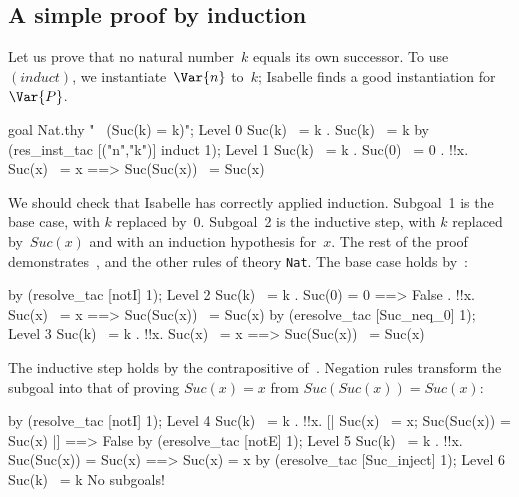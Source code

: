 \subsection{A simple proof by induction}
Let us prove that no natural number~$k$ equals its own successor.  To
use~$(induct)$, we instantiate~$\Var{n}$ to~$k$; Isabelle finds a good
instantiation for~$\Var{P}$.
\begin{ttbox}
goal Nat.thy "~ (Suc(k) = k)";
{\out Level 0}
{\out Suc(k) ~= k}
{. Suc(k) ~= k}
\ttbreak
by (res_inst_tac [("n","k")] induct 1);
{\out Level 1}
{\out Suc(k) ~= k}
{. Suc(0) ~= 0}
{. !!x. Suc(x) ~= x ==> Suc(Suc(x)) ~= Suc(x)}
\end{ttbox}
We should check that Isabelle has correctly applied induction.  Subgoal~1
is the base case, with $k$ replaced by~0.  Subgoal~2 is the inductive step,
with $k$ replaced by~$Suc(x)$ and with an induction hypothesis for~$x$.
The rest of the proof demonstrates~,  and the
other rules of theory {\tt Nat}.  The base case holds by~:
\begin{ttbox}
by (resolve_tac [notI] 1);
{\out Level 2}
{\out Suc(k) ~= k}
{. Suc(0) = 0 ==> False}
{. !!x. Suc(x) ~= x ==> Suc(Suc(x)) ~= Suc(x)}
\ttbreak
by (eresolve_tac [Suc_neq_0] 1);
{\out Level 3}
{\out Suc(k) ~= k}
{. !!x. Suc(x) ~= x ==> Suc(Suc(x)) ~= Suc(x)}
\end{ttbox}
The inductive step holds by the contrapositive of~.
Negation rules transform the subgoal into that of proving $Suc(x)=x$ from
$Suc(Suc(x)) = Suc(x)$:
\begin{ttbox}
by (resolve_tac [notI] 1);
{\out Level 4}
{\out Suc(k) ~= k}
{. !!x. [| Suc(x) ~= x; Suc(Suc(x)) = Suc(x) |] ==> False}
\ttbreak
by (eresolve_tac [notE] 1);
{\out Level 5}
{\out Suc(k) ~= k}
{. !!x. Suc(Suc(x)) = Suc(x) ==> Suc(x) = x}
\ttbreak
by (eresolve_tac [Suc_inject] 1);
{\out Level 6}
{\out Suc(k) ~= k}
{\out No subgoals!}
\end{ttbox}


